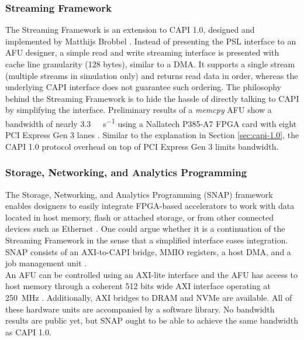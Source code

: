 \subsubsection{Streaming Framework}
The Streaming Framework is an extension to CAPI 1.0, designed and implemented by Matthijs Brobbel \cite{brobbel-github}. Instead of presenting the PSL interface to an AFU designer, a simple read and write streaming interface is presented with cache line granularity (128 bytes), similar to a DMA. It supports a single stream (multiple streams in simulation only) and returns read data in order, whereas the underlying CAPI interface does not guarantee such ordering. The philosophy behind the Streaming Framework is to hide the hassle of directly talking to CAPI by simplifying the interface. Preliminary results of a \textit{memcpy} AFU show a bandwidth of nearly \SI{3.3}{\giga\byte\per\second} using a Nallatech P385-A7 FPGA card with eight PCI Express Gen 3 lanes \cite{brobbel-slides}. Similar to the explanation in Section \ref{sec:capi-1.0}, the CAPI 1.0 protocol overhead on top of PCI Express Gen 3 limits bandwidth.




\subsubsection{Storage, Networking, and Analytics Programming}
The Storage, Networking, and Analytics Programming (SNAP) framework enables designers to easily integrate FPGA-based accelerators to work with data located in host memory, flash or attached storage, or from other connected devices such as Ethernet \cite{snap-slides}. One could argue whether it is a continuation of the Streaming Framework in the sense that a simplified interface eases integration. SNAP consists of an AXI-to-CAPI bridge, MMIO registers, a host DMA, and a job management unit \cite{snap-github}.\\
An AFU can be controlled using an AXI-lite interface and the AFU has access to host memory through a coherent 512 bits wide AXI interface operating at \SI{250}{\mega\hertz} \cite{fuchs}. Additionally, AXI bridges to DRAM and NVMe are available. All of these hardware units are accompanied by a software library. No bandwidth results are public yet, but SNAP ought to be able to achieve the same bandwidth as CAPI 1.0.




